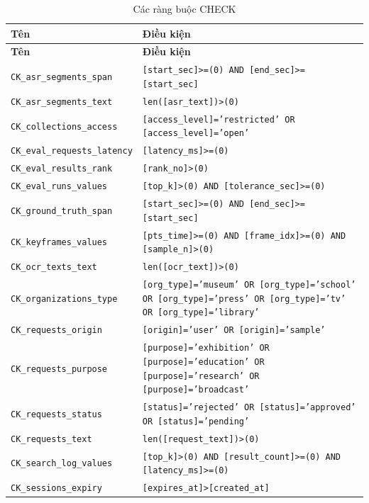 \begin{longtable}{>{\raggedright\arraybackslash}p{}>{\raggedright\arraybackslash}p{}}
\caption{Các ràng buộc CHECK}\label{tab:checks}\\
\toprule \textbf{Tên} & \textbf{Điều kiện} \\ \midrule \endfirsthead
\toprule \textbf{Tên} & \textbf{Điều kiện} \\ \midrule \endhead
\bottomrule \endfoot
\texttt{CK\_asr\_segments\_span} & \texttt{[start\_sec]>=(0) AND [end\_sec]>=[start\_sec]} \\
\texttt{CK\_asr\_segments\_text} & \texttt{len([asr\_text])>(0)} \\
\texttt{CK\_collections\_access} & \texttt{[access\_level]='restricted' OR [access\_level]='open'} \\
\texttt{CK\_eval\_requests\_latency} & \texttt{[latency\_ms]>=(0)} \\
\texttt{CK\_eval\_results\_rank} & \texttt{[rank\_no]>(0)} \\
\texttt{CK\_eval\_runs\_values} & \texttt{[top\_k]>(0) AND [tolerance\_sec]>=(0)} \\
\texttt{CK\_ground\_truth\_span} & \texttt{[start\_sec]>=(0) AND [end\_sec]>=[start\_sec]} \\
\texttt{CK\_keyframes\_values} & \texttt{[pts\_time]>=(0) AND [frame\_idx]>=(0) AND [sample\_n]>(0)} \\
\texttt{CK\_ocr\_texts\_text} & \texttt{len([ocr\_text])>(0)} \\
\texttt{CK\_organizations\_type} & \texttt{[org\_type]='museum' OR [org\_type]='school' OR [org\_type]='press' OR [org\_type]='tv' OR [org\_type]='library'} \\
\texttt{CK\_requests\_origin} & \texttt{[origin]='user' OR [origin]='sample'} \\
\texttt{CK\_requests\_purpose} & \texttt{[purpose]='exhibition' OR [purpose]='education' OR [purpose]='research' OR [purpose]='broadcast'} \\
\texttt{CK\_requests\_status} & \texttt{[status]='rejected' OR [status]='approved' OR [status]='pending'} \\
\texttt{CK\_requests\_text} & \texttt{len([request\_text])>(0)} \\
\texttt{CK\_search\_log\_values} & \texttt{[top\_k]>(0) AND [result\_count]>=(0) AND [latency\_ms]>=(0)} \\
\texttt{CK\_sessions\_expiry} & \texttt{[expires\_at]>[created\_at]} \\

\end{longtable}
